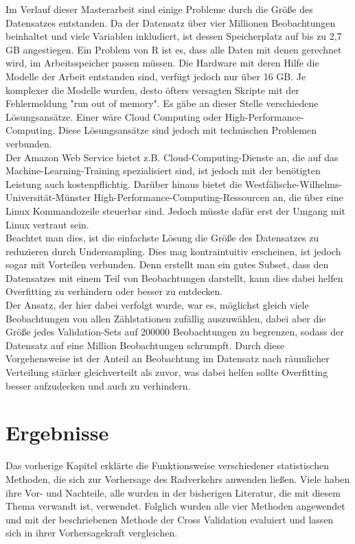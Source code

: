 \documentclass[a4paper,12pt]{thesis}
\begin{document}
Im Verlauf dieser Masterarbeit sind einige Probleme durch die Größe des Datensatzes entstanden. Da der Datensatz über vier Millionen Beobachtungen beinhaltet und viele Variablen inkludiert, ist dessen Speicherplatz auf bis zu 2,7 GB angestiegen. Ein Problem von R ist es, dass alle Daten mit denen gerechnet wird, im Arbeitsspeicher passen müssen. Die Hardware mit deren Hilfe die Modelle der Arbeit entstanden sind, verfügt jedoch nur über 16 GB. Je komplexer die Modelle wurden, desto öfters versagten Skripte mit der Fehlermeldung "run out of memory". Es gäbe an dieser Stelle verschiedene Lösungsansätze. Einer wäre Cloud Computing oder High-Performance-Computing. Diese Lösungsansätze sind jedoch mit technischen Problemen verbunden.\\ 
Der Amazon Web Service bietet z.B. Cloud-Computing-Dienste an, die auf das Machine-Learning-Training spezialisiert sind, ist jedoch mit der benötigten Leistung auch kostenpflichtig. Darüber hinaus bietet die Westfälische-Wilhelms-Universität-Münster High-Performance-Computing-Ressourcen an, die über eine Linux Kommandozeile steuerbar sind. Jedoch müsste dafür erst der Umgang mit Linux vertraut sein.\\
Beachtet man dies, ist die einfachste Lösung die Größe des Datensatzes zu reduzieren durch Undersampling. Dies mag kontraintuitiv erscheinen, ist jedoch sogar mit Vorteilen verbunden. Denn erstellt man ein gutes Subset, dass den Datensatzes mit einem Teil von Beobachtungen darstellt, kann dies dabei helfen Overfitting zu verhindern oder besser zu entdecken.\\
Der Ansatz, der hier dabei verfolgt wurde, war es, möglichst gleich viele Beobachtungen von allen Zählstationen zufällig auszuwählen, dabei aber die Größe jedes Validation-Sets auf 200000 Beobachtungen zu begrenzen, sodass der Datensatz auf eine Million Beobachtungen schrumpft. Durch diese Vorgehensweise ist der Anteil an Beobachtung im Datensatz nach räumlicher Verteilung stärker gleichverteilt als zuvor, was dabei helfen sollte Overfitting besser aufzudecken und auch zu verhindern.

\chapter{Ergebnisse}

Das vorherige Kapitel erklärte die Funktionsweise verschiedener statistischen Methoden, die sich zur Vorhersage des Radverkehrs anwenden ließen. Viele haben ihre Vor- und Nachteile, alle wurden in der bisherigen Literatur, die mit diesem Thema verwandt ist, verwendet. Folglich wurden alle vier Methoden angewendet und mit der beschriebenen Methode der Cross Validation evaluiert und lassen sich in ihrer Vorhersagekraft vergleichen.
\end{document}
